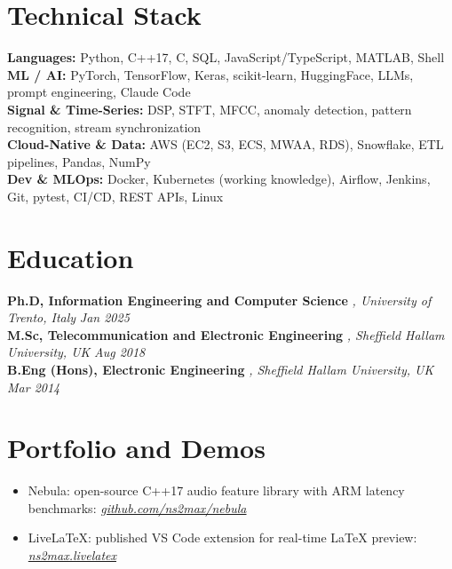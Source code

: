 \documentclass[11pt]{article}
\begin{document}
\section*{Technical Stack}
\textbf{Languages:} Python, C++17, C, SQL, JavaScript/TypeScript, MATLAB, Shell\\
\textbf{ML / AI:} PyTorch, TensorFlow, Keras, scikit-learn, HuggingFace, LLMs, prompt engineering, Claude Code\\
\textbf{Signal \& Time-Series:} DSP, STFT, MFCC, anomaly detection, pattern recognition, stream synchronization\\
\textbf{Cloud-Native \& Data:} AWS (EC2, S3, ECS, MWAA, RDS), Snowflake, ETL pipelines, Pandas, NumPy\\
\textbf{Dev \& MLOps:} Docker, Kubernetes (working knowledge), Airflow, Jenkins, Git, pytest, CI/CD, REST APIs, Linux

\section*{Education}
\textbf{Ph.D, Information Engineering and Computer Science} \textit{\small{, University of Trento, Italy}} \hfill \textit{Jan 2025}\\[2pt]
\noindent\textbf{M.Sc, Telecommunication and Electronic Engineering} \textit{\small{, Sheffield Hallam University, UK}} \hfill \textit{Aug 2018}\\[2pt]
\noindent\textbf{B.Eng (Hons), Electronic Engineering} \textit{\small{, Sheffield Hallam University, UK}} \hfill \textit{Mar 2014}

\section*{Portfolio and Demos \footnotesize {}}
\begin{itemize}[leftmargin=1.2em, itemsep=-0.25em]
    \item Nebula: open-source C++17 audio feature library with ARM latency benchmarks: \href{https://github.com/ns2max/nebula}{\textit{github.com/ns2max/nebula}}
    \item LiveLaTeX: published VS Code extension for real-time LaTeX preview: \href{https://marketplace.visualstudio.com/items?itemName=ns2max.livelatex}{\textit{ns2max.livelatex}}
\end{itemize}
\end{document}
